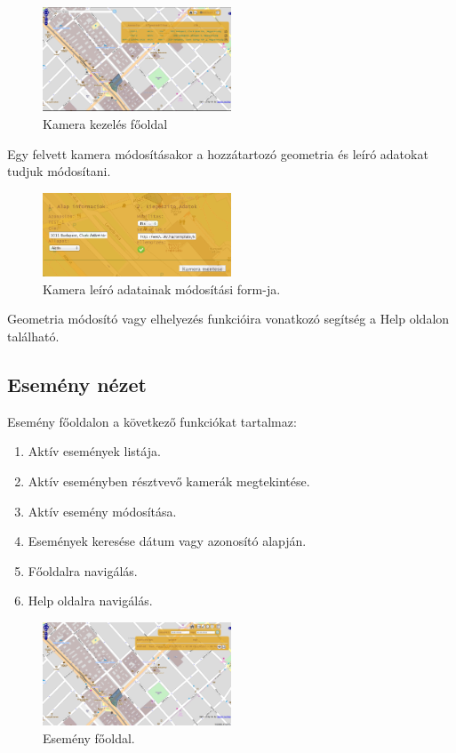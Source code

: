 \begin{figure}[h!]
  \centering
  \includegraphics[width=0.5\textwidth]{chapters/chap4/cam_main.png}
  \caption{Kamera kezelés főoldal}
\end{figure}

Egy felvett kamera módosításakor a hozzátartozó geometria és leíró adatokat tudjuk módosítani.
\begin{figure}[h!]
  \centering
  \includegraphics[width=0.5\textwidth]{chapters/chap4/cam_edit.png}
  \caption{Kamera leíró adatainak módosítási form-ja.}
\end{figure}

Geometria módosító vagy elhelyezés funkcióira vonatkozó segítség a Help oldalon található.


\subsection{Esemény nézet} %
\label{sub:esemény_nézet}
Esemény főoldalon a következő funkciókat tartalmaz:
\begin{enumerate}
  \item Aktív események listája.
  \item Aktív eseményben résztvevő kamerák megtekintése.
  \item Aktív esemény módosítása.
  \item Események keresése dátum vagy azonosító alapján.
  \item Főoldalra navigálás.
  \item Help oldalra navigálás.
\end{enumerate}

\begin{figure}[h!]
  \centering
  \includegraphics[width=0.5\textwidth]{chapters/chap4/scenario_main.png}
  \caption{Esemény főoldal.}
\end{figure}

